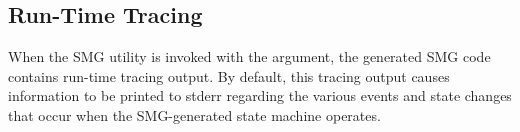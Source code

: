 
\subsection{Run-Time Tracing}
\label{section:tracing}

When the SMG utility is invoked with the  argument, the
generated SMG code contains run-time tracing output.  By default, this
tracing output causes information to be printed to stderr regarding
the various events and state changes that occur when the SMG-generated
state machine operates.


